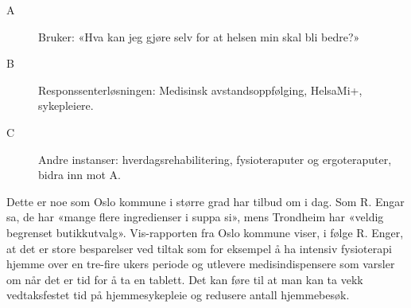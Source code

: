 \begin{description}
\item[A] Bruker: «Hva kan jeg gjøre selv for at helsen min skal bli bedre?»
\item[B] Responssenterløsningen: Medisinsk avstandsoppfølging, HelsaMi+, sykepleiere.
\item[C] Andre instanser: hverdagsrehabilitering, fysioteraputer og ergoteraputer, bidra inn mot A.
\end{description}

Dette er noe som Oslo kommune i større grad har tilbud om i dag. Som R. Engar sa, de har «mange flere ingredienser i suppa si», mens Trondheim
har «veldig begrenset butikkutvalg». Vis-rapporten fra Oslo kommune viser, i følge R. Enger, at det er store besparelser ved tiltak som
for eksempel å ha intensiv fysioterapi hjemme over en tre-fire ukers periode og utlevere  medisindispensere som varsler om når det er tid for
å ta en tablett. Det kan føre til at man kan ta vekk vedtaksfestet tid på hjemmesykepleie og redusere antall hjemmebesøk.
